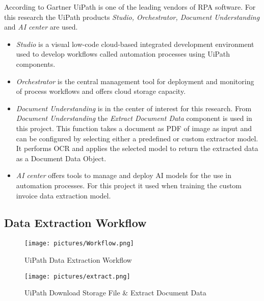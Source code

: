 According to Gartner \cite{gartner2023magicquadrant} UiPath is one of the leading vendors of \acl{RPA} software. For this research the UiPath products \textit{Studio, Orchestrator, Document Understanding} and \textit{AI center} are used. 
\begin{itemize}
    \item \textit{Studio} is a visual low-code cloud-based integrated development environment used to develop workflows called automation processes using UiPath components. 
    \item \textit{Orchestrator} is the central management tool for deployment and monitoring of process workflows and offers cloud storage capacity. 
    \item \textit{Document Understanding} is in the center of interest for this research. From \textit{Document Understanding} the \textit{Extract Document Data} component is used in this project. This function takes a document as PDF of image as input and can be configured by selecting either a predefined or custom extractor model. It performs \ac{OCR} and applies the selected model to return the extracted data as a Document Data Object.
    \item \textit{AI center} offers tools to manage and deploy \ac{AI} models for the use in automation processes. For this project it used when training the custom invoice data extraction model. \cite{uipath}
\end{itemize}

\subsection{Data Extraction Workflow}
\begin{figure}[ht]
    \centering 
    \texttt{[image: pictures/Workflow.png]}
    \caption{UiPath Data Extraction Workflow}
    \label{pic:UiPath_1}    %
\end{figure}
\begin{figure}[ht]
    \centering 
    \texttt{[image: pictures/extract.png]}
    \caption{UiPath Download Storage File \& Extract Document Data}
    \label{pic:UiPath_2}    %
\end{figure}

